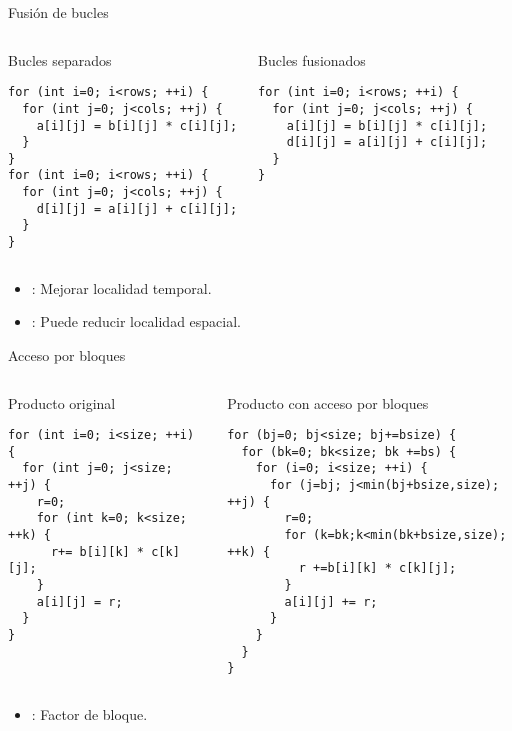 \begin{frame}[t,fragile]{Fusión de bucles}
\begin{columns}[T]

\begin{block}{Bucles separados}
\begin{lstlisting}
for (int i=0; i<rows; ++i) {
  for (int j=0; j<cols; ++j) {
    a[i][j] = b[i][j] * c[i][j];
  }
}
for (int i=0; i<rows; ++i) {
  for (int j=0; j<cols; ++j) {
    d[i][j] = a[i][j] + c[i][j];
  }
}
\end{lstlisting}
\end{block}

\pause
{}
\begin{block}{Bucles fusionados}
\begin{lstlisting}
for (int i=0; i<rows; ++i) {
  for (int j=0; j<cols; ++j) {
    a[i][j] = b[i][j] * c[i][j];
    d[i][j] = a[i][j] + c[i][j];
  }
}
\end{lstlisting}
\end{block}
\end{columns}

\begin{itemize}
  \item {}: Mejorar localidad temporal.
  \item {}: Puede reducir localidad espacial.
\end{itemize}

\end{frame}

\begin{frame}[t,fragile]{Acceso por bloques}
\begin{columns}[T]

\begin{block}{Producto original}
\begin{lstlisting}
for (int i=0; i<size; ++i) {
  for (int j=0; j<size; ++j) {
    r=0;
    for (int k=0; k<size; ++k) {
      r+= b[i][k] * c[k][j];
    }
    a[i][j] = r;
  }
}
\end{lstlisting}
\end{block}

\pause
{}
\begin{block}{Producto con acceso por bloques}
\begin{lstlisting}
for (bj=0; bj<size; bj+=bsize) {
  for (bk=0; bk<size; bk +=bs) {
    for (i=0; i<size; ++i) {
      for (j=bj; j<min(bj+bsize,size); ++j) {
        r=0;
        for (k=bk;k<min(bk+bsize,size); ++k) {
          r +=b[i][k] * c[k][j];
        }
        a[i][j] += r;
      }
    }
  }
}
\end{lstlisting}
\end{block}
\end{columns}

\begin{itemize}
  \item {}: Factor de bloque.
\end{itemize}

\end{frame}

